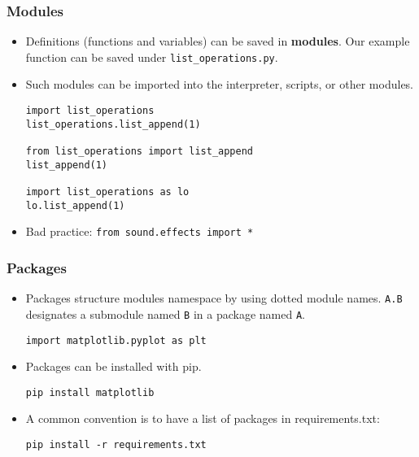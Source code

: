\begin{frame}[fragile]
    \frametitle{Modules}
    \begin{itemize}
        \item Definitions (functions and variables) can be saved in
        \textbf{modules}. Our example function can be saved under
        \texttt{list_operations.py}.
        \item Such modules can be imported into the interpreter,
        scripts, or other modules.
\begin{verbatim}
import list_operations
list_operations.list_append(1)

from list_operations import list_append
list_append(1)

import list_operations as lo
lo.list_append(1)
\end{verbatim}
        \item Bad practice: \texttt{from sound.effects import *}
    \end{itemize}
\end{frame}

\begin{frame}
    \frametitle{Packages}
    \begin{itemize}
        \item Packages structure modules namespace by using dotted
        module names. \texttt{A.B} designates a submodule
        named \texttt{B} in a package named
        \texttt{A}.
\begin{verbatim}
import matplotlib.pyplot as plt
\end{verbatim}
        \item Packages can be installed with pip.
\begin{verbatim}
pip install matplotlib
\end{verbatim}
        \item A common convention is to have a list of packages in requirements.txt:
\begin{verbatim}
pip install -r requirements.txt
\end{verbatim}
    \end{itemize}
\end{frame}

